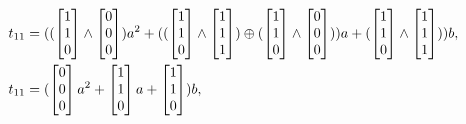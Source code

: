 \begin{equation*}
\begin{split}
        t_{11} &= ((\begin{bmatrix} 1\\ 1\\ 0 \end{bmatrix} \wedge \begin{bmatrix} 0\\ 0\\ 0 \end{bmatrix})a^2 + ((\begin{bmatrix} 1\\ 1\\ 0 \end{bmatrix} \wedge \begin{bmatrix} 1\\ 1\\ 1 \end{bmatrix}) \xor (\begin{bmatrix} 1\\ 1\\ 0 \end{bmatrix} \wedge \begin{bmatrix} 0\\ 0\\ 0 \end{bmatrix}))a + (\begin{bmatrix} 1\\ 1\\ 0 \end{bmatrix} \wedge \begin{bmatrix} 1\\ 1\\ 1 \end{bmatrix}))b,\\
        t_{11} &= (\begin{bmatrix} 0\\ 0\\ 0 \end{bmatrix}a^2 + \begin{bmatrix} 1\\ 1\\ 0 \end{bmatrix}a + \begin{bmatrix} 1\\ 1\\ 0 \end{bmatrix})b,\\

\end{split}
\end{equation*}
